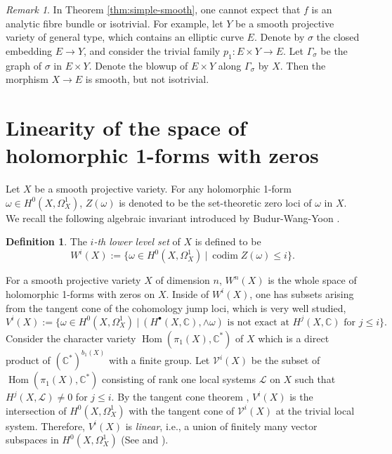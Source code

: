 \documentclass[a4paper,12pt,reqno]{amsart}
\theoremstyle{question}
\theoremstyle{definition}
\newtheorem{definition}[theorem]{Definition}
\theoremstyle{remark}
\newtheorem{remark}[theorem]{Remark}
\theoremstyle{cited}
\theoremstyle{citeddef}
\def\CC{{\mathbb C}}
\def\cL{\mathcal{L}}
\def\cV{\mathcal{V}}
\DeclareMathOperator{\codim}{codim}
\DeclareMathOperator{\Hom}{Hom}
\begin{document}
\begin{remark}
    In Theorem \ref{thm:simple-smooth}, one cannot expect that $f$ is an analytic fibre bundle or isotrivial. For example, let $Y$ be a smooth projective variety of general type, which contains an elliptic curve $E$. Denote by $\sigma$ the closed embedding $E\to Y$, and consider the trivial family $p_1\colon E\times Y\to E$. Let $\Gamma_{\sigma}$ be the graph of $\sigma$ in $E\times Y$. Denote the blowup of $E\times Y$ along $\Gamma_{\sigma}$ by $X$. Then the morphism $X\to E$ is smooth, but not isotrivial.  
\end{remark}


\section{Linearity of the space of holomorphic 1-forms with zeros}\label{sect:deg-1-form-linear}
Let $X$ be a smooth projective variety. For any holomorphic 1-form $\omega\in H^0(X, \Omega_X^1)$, $Z(\omega)$ is denoted to be the set-theoretic zero loci of $\omega$ in $X$. We recall the following algebraic invariant introduced by Budur-Wang-Yoon \cite{BWY16}. 

\begin{definition}
The \textit{$i$-th lower level set} of $X$ is defined to be 
\[
W^i(X):=\{\omega\in H^0(X, \Omega_X^1)\ |\ \codim Z(\omega)\leq i \}.
\] 
\end{definition}

For a smooth projective variety $X$ of dimension $n$, $W^n(X)$ is the whole space of holomorphic 1-forms with zeros on $X$. Inside of $W^i(X)$, one has subsets arising from the tangent cone of the cohomology jump loci, which is very well studied,
\[
V^i(X):=\{\omega\in H^0(X, \Omega_X^1)\ |\ (H^{\bullet}(X,\CC),\wedge\omega)\text{ is not exact at } H^j(X,\CC) \text{ for } j\leq i\}.
\]
Consider the character variety $\Hom(\pi_1(X),\CC^{\ast})$ of $X$ which is a direct product of $(\CC^{\ast})^{b_1(X)}$ with a finite group. Let $\cV^i(X)$ be the subset of $\Hom(\pi_1(X),\CC^{\ast})$ consisting of rank one local systems $\cL$ on $X$ such that $H^{j}(X,\cL)\neq 0$ for $j\leq i$. By the tangent cone theorem \cite[Theorem A]{DPS09}, $V^i(X)$ is the intersection of $H^0(X, \Omega_X^1)$ with the tangent cone of $\cV^i(X)$ at the trivial local system. Therefore, $V^i(X)$ is \textit{linear}, i.e., a union of finitely many vector subspaces in $H^0(X, \Omega_X^1)$ (See \cite{Bea88} and \cite{Sim93}).
\end{document}
